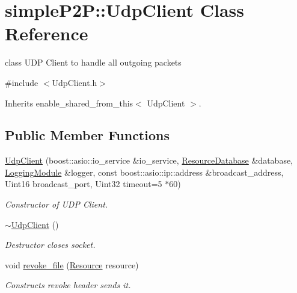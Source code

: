\hypertarget{classsimpleP2P_1_1UdpClient}{}\section{simple\+P2P\+:\+:Udp\+Client Class Reference}
\label{classsimpleP2P_1_1UdpClient}


class U\+DP Client to handle all outgoing packets  




{\ttfamily \#include $<$Udp\+Client.\+h$>$}



Inherits enable\+\_\+shared\+\_\+from\+\_\+this$<$ Udp\+Client $>$.

\subsection*{Public Member Functions}
\begin{DoxyCompactItemize}
\item 
\hyperlink{classsimpleP2P_1_1UdpClient_a0596d4eb1e1a611a4306b13008eae1b4}{Udp\+Client} (boost\+::asio\+::io\+\_\+service \&io\+\_\+service, \hyperlink{classsimpleP2P_1_1ResourceDatabase}{Resource\+Database} \&database, \hyperlink{classsimpleP2P_1_1LoggingModule}{Logging\+Module} \&logger, const boost\+::asio\+::ip\+::address \&broadcast\+\_\+address, Uint16 broadcast\+\_\+port, Uint32 timeout=5 $\ast$60)
\begin{DoxyCompactList}\small\item\em Constructor of U\+DP Client. \end{DoxyCompactList}\item 
\mbox{\label{classsimpleP2P_1_1UdpClient_a544cf1a231986b3c997593594b5ff925}} 
\hyperlink{classsimpleP2P_1_1UdpClient_a544cf1a231986b3c997593594b5ff925}{$\sim$\+Udp\+Client} ()
\begin{DoxyCompactList}\small\item\em Destructor closes socket. \end{DoxyCompactList}\item 
void \hyperlink{classsimpleP2P_1_1UdpClient_a0dc7645a01f83c3eded8e237b3b49eb1}{revoke\+\_\+file} (\hyperlink{classsimpleP2P_1_1Resource}{Resource} resource)
\begin{DoxyCompactList}\small\item\em Constructs revoke header sends it. \end{DoxyCompactList}\end{DoxyCompactItemize}


